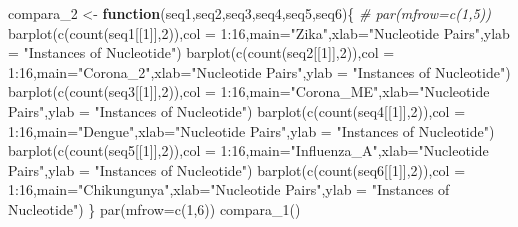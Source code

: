 \documentclass[
]{article}
\newenvironment{Shaded}{\begin{snugshade}}{\end{snugshade}}
\newcommand{\AttributeTok}[1]{\textcolor[rgb]{0.77,0.63,0.00}{#1}}
\newcommand{\CommentTok}[1]{\textcolor[rgb]{0.56,0.35,0.01}{\textit{#1}}}
\newcommand{\ControlFlowTok}[1]{\textcolor[rgb]{0.13,0.29,0.53}{\textbf{#1}}}
\newcommand{\DecValTok}[1]{\textcolor[rgb]{0.00,0.00,0.81}{#1}}
\newcommand{\FunctionTok}[1]{\textcolor[rgb]{0.00,0.00,0.00}{#1}}
\newcommand{\NormalTok}[1]{#1}
\newcommand{\OtherTok}[1]{\textcolor[rgb]{0.56,0.35,0.01}{#1}}
\newcommand{\SpecialCharTok}[1]{\textcolor[rgb]{0.00,0.00,0.00}{#1}}
\newcommand{\StringTok}[1]{\textcolor[rgb]{0.31,0.60,0.02}{#1}}
\begin{document}
\begin{Shaded}
\begin{Highlighting}[]
\NormalTok{compara\_2 }\OtherTok{\textless{}{-}} \ControlFlowTok{function}\NormalTok{(seq1,seq2,seq3,seq4,seq5,seq6)\{}
  \CommentTok{\# par(mfrow=c(1,5))}
  \FunctionTok{barplot}\NormalTok{(}\FunctionTok{c}\NormalTok{(}\FunctionTok{count}\NormalTok{(seq1[[}\DecValTok{1}\NormalTok{]],}\DecValTok{2}\NormalTok{)),}\AttributeTok{col =} \DecValTok{1}\SpecialCharTok{:}\DecValTok{16}\NormalTok{,}\AttributeTok{main=}\StringTok{"Zika"}\NormalTok{,}\AttributeTok{xlab=}\StringTok{"Nucleotide Pairs"}\NormalTok{,}\AttributeTok{ylab =} \StringTok{"Instances of Nucleotide"}\NormalTok{)}
  \FunctionTok{barplot}\NormalTok{(}\FunctionTok{c}\NormalTok{(}\FunctionTok{count}\NormalTok{(seq2[[}\DecValTok{1}\NormalTok{]],}\DecValTok{2}\NormalTok{)),}\AttributeTok{col =} \DecValTok{1}\SpecialCharTok{:}\DecValTok{16}\NormalTok{,}\AttributeTok{main=}\StringTok{"Corona\_2"}\NormalTok{,}\AttributeTok{xlab=}\StringTok{"Nucleotide Pairs"}\NormalTok{,}\AttributeTok{ylab =} \StringTok{"Instances of Nucleotide"}\NormalTok{)}
  \FunctionTok{barplot}\NormalTok{(}\FunctionTok{c}\NormalTok{(}\FunctionTok{count}\NormalTok{(seq3[[}\DecValTok{1}\NormalTok{]],}\DecValTok{2}\NormalTok{)),}\AttributeTok{col =} \DecValTok{1}\SpecialCharTok{:}\DecValTok{16}\NormalTok{,}\AttributeTok{main=}\StringTok{"Corona\_ME"}\NormalTok{,}\AttributeTok{xlab=}\StringTok{"Nucleotide Pairs"}\NormalTok{,}\AttributeTok{ylab =} \StringTok{"Instances of Nucleotide"}\NormalTok{)}
  \FunctionTok{barplot}\NormalTok{(}\FunctionTok{c}\NormalTok{(}\FunctionTok{count}\NormalTok{(seq4[[}\DecValTok{1}\NormalTok{]],}\DecValTok{2}\NormalTok{)),}\AttributeTok{col =} \DecValTok{1}\SpecialCharTok{:}\DecValTok{16}\NormalTok{,}\AttributeTok{main=}\StringTok{"Dengue"}\NormalTok{,}\AttributeTok{xlab=}\StringTok{"Nucleotide Pairs"}\NormalTok{,}\AttributeTok{ylab =} \StringTok{"Instances of Nucleotide"}\NormalTok{)}
  \FunctionTok{barplot}\NormalTok{(}\FunctionTok{c}\NormalTok{(}\FunctionTok{count}\NormalTok{(seq5[[}\DecValTok{1}\NormalTok{]],}\DecValTok{2}\NormalTok{)),}\AttributeTok{col =} \DecValTok{1}\SpecialCharTok{:}\DecValTok{16}\NormalTok{,}\AttributeTok{main=}\StringTok{"Influenza\_A"}\NormalTok{,}\AttributeTok{xlab=}\StringTok{"Nucleotide Pairs"}\NormalTok{,}\AttributeTok{ylab =} \StringTok{"Instances of Nucleotide"}\NormalTok{)}
  \FunctionTok{barplot}\NormalTok{(}\FunctionTok{c}\NormalTok{(}\FunctionTok{count}\NormalTok{(seq6[[}\DecValTok{1}\NormalTok{]],}\DecValTok{2}\NormalTok{)),}\AttributeTok{col =} \DecValTok{1}\SpecialCharTok{:}\DecValTok{16}\NormalTok{,}\AttributeTok{main=}\StringTok{"Chikungunya"}\NormalTok{,}\AttributeTok{xlab=}\StringTok{"Nucleotide Pairs"}\NormalTok{,}\AttributeTok{ylab =} \StringTok{"Instances of Nucleotide"}\NormalTok{)}
\NormalTok{\}}
\FunctionTok{par}\NormalTok{(}\AttributeTok{mfrow=}\FunctionTok{c}\NormalTok{(}\DecValTok{1}\NormalTok{,}\DecValTok{6}\NormalTok{))}
\FunctionTok{compara\_1}\NormalTok{()}
\end{Highlighting}
\end{Shaded}
\end{document}

